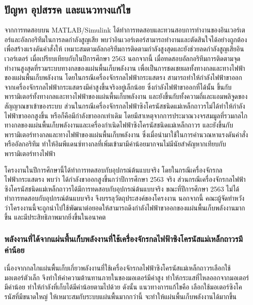 \documentclass[11pt,a4paper]{article}
\begin{document}
\subsection{ปัญหา อุปสรรค และแนวทางแก้ไข}
จากการทดสอบบน MATLAB/Simulink ได้ทำการทดสอบและทวนสอบการทำงานของอินเวอร์เตอร์และอัลกอริทึมในการลดกำลังสูญเสีย พบว่าอินเวอร์เตอร์สามารถทำงานและตัดสินใจได้อย่างถูกต้อง เพื่อสร้างแรงดันคำสั่งให้ เหมาะสมตามอัลกอริทึมการติดตามกำลังสูงสุดและยังช่วยลดกำลังสูญเสียอินเวอร์เตอร์ เมื่อเปรียบเทียบกับในปีการศึกษา 2563 นอกจากนี้ เมื่อทดสอบอัลกอริทึมการติดตามจุดทำงานสูงสุดที่รวมระบบทางกลของแผ่นพื้นเก็บพลังงาน เพื่อเป็นการชดเชยผลทั้งทางกลและทางไฟฟ้าของแผ่นพื้นเก็บพลังงาน โดยในกรณีเครื่องจักรกลไฟฟ้ากระแสตรง สามารถทำให้กำลังไฟฟ้าขาออกจากเครื่องจักรกลไฟฟ้ากระแสตรงมีค่าสูงขึ้นจริงอยู่เล็กน้อย ซึ่งกำลังไฟฟ้าขาออกที่ได้นั้น ขึ้นกับพารามิเตอร์ทั้งทางกลและทางไฟฟ้าของแผ่นพื้นเก็บพลังงาน และยังขึ้นกับทั้งความถี่และแอมพลิจูดของสัญญาณขาเข้าของระบบ ส่วนในกรณีเครื่องจักรกลไฟฟ้าซิงโครนัสชนิดแม่เหล็กถาวรไม่ได้ทำให้กำลังไฟฟ้าขาออกสูงขึ้น หรือก็คือมีกำลังขาออกเท่าเดิม โดยมีสาเหตุจากการประมาณวงจรสมมูลที่รวมกลไกทางกลของแผ่นพื้นเก็บพลังงานและเครื่องกำเนิดไฟฟ้าซิงโครนัสชนิดแม่เหล็กถาวร และยังขึ้นกับพารามิเตอร์ทางกลและทางไฟฟ้าของแผ่นพื้นเก็บพลังงาน ซึ่งเมื่อนำมาใช้ในการคำนวณหาแรงดันคำสั่งหรืออัลกอริทึม ทำให้อิมพีแดนซ์ทางกลที่เพิ่มเข้ามามีค่าน้อยมากจนไม่มีนัยสำคัญหากเทียบกับพารามิเตอร์ทางไฟฟ้า

โครงงานในปีการศึกษานี้ได้ทำการทดสอบกับอุปกรณ์ต้นแบบจริง โดยในกรณีเครื่องจักรกลไฟฟ้ากระแสตรง พบว่า ได้กำลังขาออกสูงขึ้นกว่าปีการศึกษา 2563 จริง ส่วนกรณีเครื่องจักรกลไฟฟ้าซิงโครนัสชนิดแม่เหล็กถาวรได้มีการทดสอบกับอุปกรณ์ต้นแบบจริง ขณะที่ปีการศึกษา 2563 ไม่ได้ทำการทดสอบกับอุปกรณ์ต้นแบบจริง จึงบรรลุวัตถุประสงค์ของโครงงาน นอกจากนี้ คณะผู้จัดทำหวังว่าโครงงานนี้จะถูกนำไปใช้พัฒนาต่อยอดให้สามารถดึงกำลังไฟฟ้าขาออกของแผ่นพื้นเก็บพลังงานมากขึ้น และมีประสิทธิภาพมากยิ่งขึ้นในอนาคต

\subsubsection{พลังงานที่ได้จากแผ่นพื้นเก็บพลังงานที่ใช้เครื่องจักรกลไฟฟ้าซิงโครนัสแม่เหล็กถาวรมีค่าน้อย}

เนื่องจากกลไกแผ่นพื้นเก็บเกี่ยวพลังงานที่ใช้เครื่องจักรกลไฟฟ้าซิงโครนัสแม่เหล็กถาวรเลือกใช้มอเตอร์ตัวเล็ก จึงทำให้ค่าความต้านทานภายในของมอเตอร์มีค่าสูง ทำให้กระแสที่ไหลออกจากมอเตอร์มีค่าน้อย ทำให้กำลังที่เก็บได้มีค่าน้อยตามไปด้วย ดังนั้น แนวทางการแก้ไขคือ เลือกใช้มอเตอร์ซิงโครนัสที่มีขนาดใหญ่ ให้เหมาะสมกับระบบแผ่นพื้นมากกว่านี้ จะทำให้แผ่นพื้นเก็บพลังงานได้มากขึ้น
\end{document}
